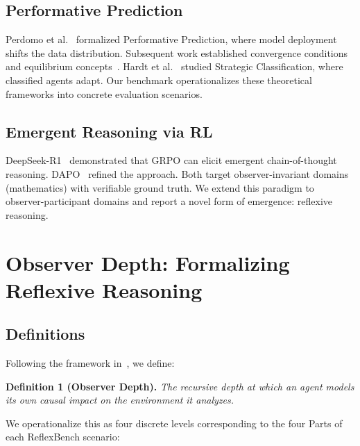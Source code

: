 \documentclass{article}
\begin{document}
\subsection{Performative Prediction}
Perdomo et al.~\citep{perdomo2020} formalized Performative Prediction, where model deployment shifts the data distribution. Subsequent work established convergence conditions and equilibrium concepts~\citep{mendler2020}. Hardt et al.~\citep{hardt2016} studied Strategic Classification, where classified agents adapt. Our benchmark operationalizes these theoretical frameworks into concrete evaluation scenarios.

\subsection{Emergent Reasoning via RL}
DeepSeek-R1~\citep{guo2025} demonstrated that GRPO can elicit emergent chain-of-thought reasoning. DAPO~\citep{yu2025} refined the approach. Both target observer-invariant domains (mathematics) with verifiable ground truth. We extend this paradigm to observer-participant domains and report a novel form of emergence: reflexive reasoning.

\section{Observer Depth: Formalizing Reflexive Reasoning}
\label{sec:od}

\subsection{Definitions}

Following the framework in~\citep{zhang2026}, we define:

\vspace{0.3em}
\noindent\textbf{Definition 1 (Observer Depth).} \textit{The recursive depth at which an agent models its own causal impact on the environment it analyzes.}
\vspace{0.3em}

We operationalize this as four discrete levels corresponding to the four Parts of each ReflexBench scenario:
\end{document}
